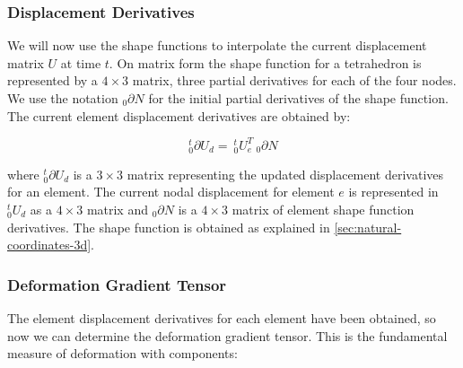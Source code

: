 





\subsubsection*{Displacement Derivatives}
\label{sec:displacement_derivatives}
We will now use the shape functions to interpolate the current
displacement matrix $U$ at time $t$. 
On matrix form the shape function for a tetrahedron is represented by
a $4 \times 3$ matrix, three partial derivatives for each of the four
nodes. We use the notation $_0\partial N$ for the initial partial
derivatives of the shape function.  
The current element displacement derivatives are obtained by:

\begin{equation}
\label{eq:displacement_derivatives}
^t_0\partial U_d = \ ^t_0U^T_e \ _0\partial N
\end{equation}

where $^t_0\partial U_d$ is a $3 \times 3$ matrix representing the
updated displacement derivatives for an element. The current nodal
displacement for element $e$ is represented in $^t_0U_d$ as a $4
\times 3$ matrix and $_0\partial N$ is a $4 \times 3$ matrix of element
shape function derivatives. The shape function is obtained as
explained in \vref{sec:natural-coordinates-3d}.


\subsubsection*{Deformation Gradient Tensor}
The element displacement derivatives for each element have been
obtained, so now we can determine the deformation gradient
tensor. This is the fundamental measure of deformation with
components:

